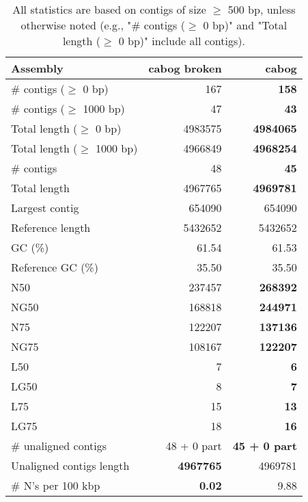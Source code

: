 \documentclass[12pt,a4paper]{article}
\begin{document}
\begin{table}[ht]
\begin{center}
\caption{All statistics are based on contigs of size $\geq$ 500 bp, unless otherwise noted (e.g., "\# contigs ($\geq$ 0 bp)" and "Total length ($\geq$ 0 bp)" include all contigs).}
\begin{tabular}{|l*{2}{|r}|}
\hline
Assembly & cabog broken & cabog \\ \hline
\# contigs ($\geq$ 0 bp) & 167 & {\bf 158} \\ \hline
\# contigs ($\geq$ 1000 bp) & 47 & {\bf 43} \\ \hline
Total length ($\geq$ 0 bp) & 4983575 & {\bf 4984065} \\ \hline
Total length ($\geq$ 1000 bp) & 4966849 & {\bf 4968254} \\ \hline
\# contigs & 48 & {\bf 45} \\ \hline
Total length & 4967765 & {\bf 4969781} \\ \hline
Largest contig & 654090 & 654090 \\ \hline
Reference length & 5432652 & 5432652 \\ \hline
GC (\%) & 61.54 & 61.53 \\ \hline
Reference GC (\%) & 35.50 & 35.50 \\ \hline
N50 & 237457 & {\bf 268392} \\ \hline
NG50 & 168818 & {\bf 244971} \\ \hline
N75 & 122207 & {\bf 137136} \\ \hline
NG75 & 108167 & {\bf 122207} \\ \hline
L50 & 7 & {\bf 6} \\ \hline
LG50 & 8 & {\bf 7} \\ \hline
L75 & 15 & {\bf 13} \\ \hline
LG75 & 18 & {\bf 16} \\ \hline
\# unaligned contigs & 48 + 0 part & {\bf 45 + 0 part} \\ \hline
Unaligned contigs length & {\bf 4967765} & 4969781 \\ \hline
\# N's per 100 kbp & {\bf 0.02} & 9.88 \\ \hline
\end{tabular}
\end{center}
\end{table}
\end{document}

